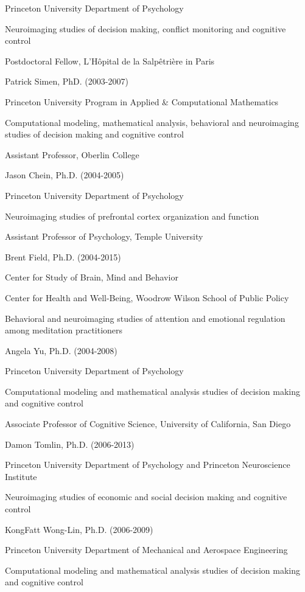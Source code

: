 \documentclass[10 pt]{article}
\begin{document}
Princeton University Department of Psychology

Neuroimaging studies of decision making, conflict monitoring and cognitive control

Postdoctoral Fellow, L'Hôpital de la Salpêtrière in Paris
    \medskip

Patrick Simen, PhD. (2003-2007)

Princeton University Program in Applied \& Computational Mathematics

Computational modeling, mathematical analysis, behavioral and neuroimaging studies of decision making and cognitive control

Assistant Professor, Oberlin College
    \medskip

Jason Chein, Ph.D. (2004-2005)

Princeton University Department of Psychology

Neuroimaging studies of prefrontal cortex organization and function

Assistant Professor of Psychology, Temple University
    \medskip

Brent Field, Ph.D. (2004-2015)

Center for Study of Brain, Mind and Behavior

Center for Health and Well-Being, Woodrow Wilson School of Public Policy

Behavioral and neuroimaging studies of attention and emotional regulation among meditation practitioners
    \medskip

Angela Yu, Ph.D. (2004-2008)

Princeton University Department of Psychology

Computational modeling and mathematical analysis studies of decision making and cognitive control

Associate Professor of Cognitive Science, University of California, San Diego
    \medskip

Damon Tomlin, Ph.D. (2006-2013)

Princeton University Department of Psychology and Princeton Neuroscience Institute

Neuroimaging studies of economic and social decision making and cognitive control
    \medskip

KongFatt Wong-Lin, Ph.D. (2006-2009)

Princeton University Department of Mechanical and Aerospace Engineering

Computational modeling and mathematical analysis studies of decision making and cognitive control
\end{document}

